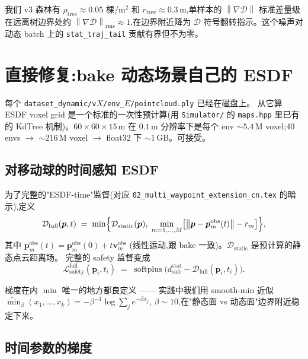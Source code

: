 \documentclass[UTF8, 11pt]{ctexart}
\newcommand{\Norm}[1]{\left\lVert #1 \right\rVert}
\newcommand{\esdf}{\mathcal{D}}
\newcommand{\softplus}{\operatorname{softplus}}
\begin{document}
我们 v3 森林有 $\rho_{\text{tree}}\!\approx\!0.05$ 棵/m$^2$ 和
$r_{\text{tree}}\!\approx\!0.3\,$m,单样本的 $\Norm{\nabla \esdf}$ 标准差量级
在远离树边界处约 $\Norm{\nabla \esdf}_{\text{rms}} \approx 1$,在边界附近降为
$\esdf$ 符号翻转指示。这个噪声对动态 batch 上的 \texttt{stat\_traj\_tail}
贡献有界但不为零。

\section{直接修复:bake 动态场景自己的 ESDF}

每个 \texttt{dataset\_dynamic/v$X$/env\_$E$/pointcloud.ply} 已经在磁盘上。
从它算 ESDF voxel grid 是一个标准的一次性预计算(用 \texttt{Simulator/}
的 \texttt{maps.hpp} 里已有的 KdTree 机制)。$60{\times}60{\times}15\,$m
在 $0.1\,$m 分辨率下是每个 env $\sim$$5.4\,$M voxel;40 envs $\to$
$\sim$$216\,$M voxel $\to$ float32 下 $\sim$$1\,$GB。可接受。

\subsection{对移动球的时间感知 ESDF}

为了完整的"ESDF-time"监督(对应
\texttt{02\_multi\_waypoint\_extension\_cn.tex} 的暗示),定义
\begin{equation}\label{eq:esdf-time}
\esdf_{\text{full}}(\bm{p}, t)
\;=\;
\min\Bigl\{
   \esdf_{\text{static}}(\bm{p}),
   \;
   \min_{m=1,\dots,M}
   \bigl[\Norm{\bm{p} - \bm{p}_m^{\text{obs}}(t)} - r_m\bigr]
\Bigr\},
\end{equation}
其中 $\bm{p}_m^{\text{obs}}(t) = \bm{p}_m^{\text{obs}}(0) + t\bm{v}_m^{\text{obs}}$
(线性运动,跟 bake 一致)。$\esdf_{\text{static}}$ 是预计算的静态点云距离场。
完整的 safety 监督变成
\begin{equation}\label{eq:safety-true}
\mathcal{L}_{\text{safety}}^{\text{full}}(\bm{p}_i, t_i)
\;=\;
\softplus\bigl(d_{\text{safe}}^{\text{stat}} - \esdf_{\text{full}}(\bm{p}_i, t_i)\bigr).
\end{equation}

梯度在内 $\min$ 唯一的地方都良定义 —— 实践中我们用 smooth-min 近似
$\widetilde{\min}_\beta(x_1, \dots, x_k) = -\beta^{-1}\log\sum_j e^{-\beta x_j}$,
$\beta \sim 10$,在"静态面 vs 动态面"边界附近稳定下来。

\subsection{时间参数的梯度}
\end{document}
